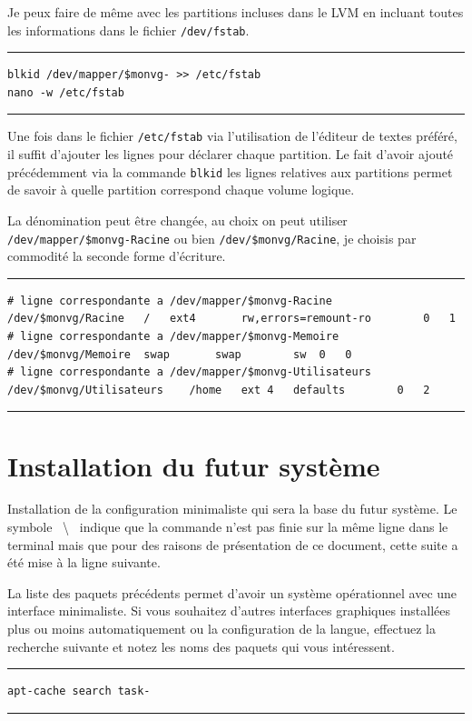 \documentclass[12pt, a4paper]{report}
\begin{document}
Je peux faire de même avec les partitions incluses dans le LVM en incluant toutes les informations dans le fichier \texttt{/dev/fstab}.

\noindent \rule{\linewidth}{0.5pt}
\begin{verbatim}
blkid /dev/mapper/$monvg- >> /etc/fstab
nano -w /etc/fstab
\end{verbatim}
\rule{\linewidth}{0.5pt}

Une fois dans le fichier \texttt{/etc/fstab} via l'utilisation de l'éditeur de textes préféré, il suffit d'ajouter les lignes pour déclarer chaque partition. 
Le fait d'avoir ajouté précédemment via la commande \texttt{blkid} les lignes relatives aux partitions permet de savoir à quelle partition correspond chaque volume logique.

La dénomination peut être changée, au choix on peut utiliser \texttt{/dev/mapper/\${}monvg-Racine} ou bien \texttt{/dev/\${}monvg/Racine}, je choisis par commodité la seconde forme d'écriture.

\noindent \rule{\linewidth}{0.5pt}
\begin{verbatim}
# ligne correspondante a /dev/mapper/$monvg-Racine
/dev/$monvg/Racine	 /	 ext4		rw,errors=remount-ro		0	1
# ligne correspondante a /dev/mapper/$monvg-Memoire
/dev/$monvg/Memoire	 swap		swap		sw	0	0
# ligne correspondante a /dev/mapper/$monvg-Utilisateurs
/dev/$monvg/Utilisateurs 	/home	ext	4	defaults		0	2
\end{verbatim}
\rule{\linewidth}{0.5pt}

\section{Installation du futur système}

Installation de la configuration minimaliste qui sera la base du futur système. 
Le symbole \og{}~\textbackslash{}~\fg{} indique que la commande n'est pas finie sur la même ligne dans le terminal mais que pour des raisons de présentation de ce document, cette suite a été mise à la ligne suivante.

La liste des paquets précédents permet d'avoir un système opérationnel avec une interface minimaliste. 
Si vous souhaitez d'autres interfaces graphiques installées plus ou moins automatiquement ou la configuration de la langue, effectuez la recherche suivante et notez les noms des paquets qui vous intéressent.

\noindent \rule{\linewidth}{0.5pt}
\begin{verbatim}
apt-cache search task-
\end{verbatim}
\rule{\linewidth}{0.5pt}
\end{document}
